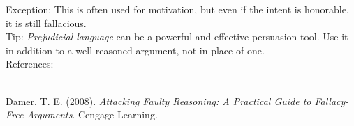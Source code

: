 \documentclass[a4paper,12pt,single,pdftex]{scrartcl}
\begin{document}
    
      Exception: This is often used for motivation, but even if the intent is honorable, it is still fallacious.
    \\

    
      Tip: {\em Prejudicial language} can be a powerful and effective persuasion tool. Use it in addition to a well-reasoned argument, not in place of one.
    \\

    References:

    
      
        
      \\

      
        
          Damer, T. E. (2008). {\it Attacking Faulty Reasoning: A Practical Guide to Fallacy-Free Arguments}. Cengage Learning.
        
      
    
\end{document}
